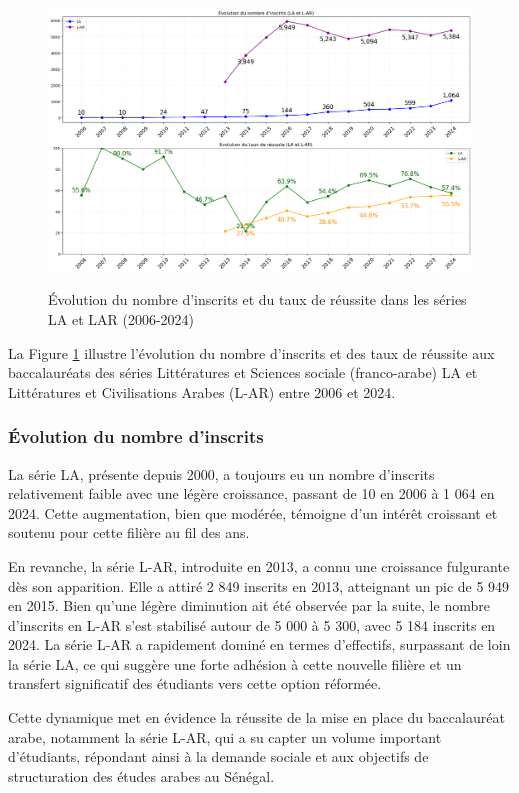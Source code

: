 \begin{figure}[ht]
\centering
\caption{Évolution du nombre d'inscrits et du taux de réussite dans les séries LA et LAR (2006-2024)}
\includegraphics[width=1\textwidth]{figure/bac_LA_LAR.png}
\label{fig:LA_LAR}
\end{figure}

La Figure \ref{fig:LA_LAR} illustre l'évolution du nombre d'inscrits et des taux de réussite aux baccalauréats des séries Littératures et Sciences sociale (franco-arabe) LA et Littératures et Civilisations Arabes (L-AR) entre 2006 et 2024.

\subsubsection{Évolution du nombre d'inscrits}

La série LA, présente depuis 2000, a toujours eu un nombre d'inscrits relativement faible avec une légère croissance, passant de 10 en 2006 à 1 064 en 2024.  
Cette augmentation, bien que modérée, témoigne d'un intérêt croissant et soutenu pour cette filière au fil des ans.

En revanche, la série L-AR, introduite en 2013, a connu une croissance fulgurante dès son apparition. 
Elle a attiré 2 849 inscrits en 2013, atteignant un pic de 5 949 en 2015. Bien qu'une légère diminution ait été observée par la suite, le nombre d'inscrits en L-AR s'est stabilisé autour de 5 000 à 5 300, avec 5 184 inscrits en 2024. 
La série L-AR a rapidement dominé en termes d'effectifs, surpassant de loin la série LA, ce qui suggère une forte adhésion à cette nouvelle filière et un transfert significatif des étudiants vers cette option réformée.

Cette dynamique met en évidence la réussite de la mise en place du baccalauréat arabe, notamment la série L-AR, qui a su capter un volume important d'étudiants, répondant ainsi à la demande sociale et aux objectifs de structuration des études arabes au Sénégal.

